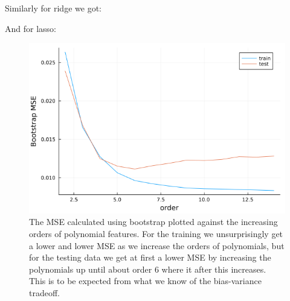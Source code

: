 \documentclass{article}
\begin{document}
Similarly for ridge we got:

\begin{table}[htpb!]
\end{table}

And for lasso:
\begin{table}[htpb!]
\end{table}

\begin{figure}
    \includegraphics[scale=0.5]{bootstrapbiasvariance}
    \caption{The MSE calculated using bootstrap plotted against the increasing
        orders of polynomial features. For the training we unsurprisingly get a
        lower and lower MSE as we increase the orders of polynomials, but for the
        testing data we get at first a lower MSE by increasing the polynomials up
        until about order $6$ where it after this increases. This is to be expected
        from what we know of the bias-variance tradeoff.}
    \label{bootstrap-bias-var}
\end{figure}
\end{document}
